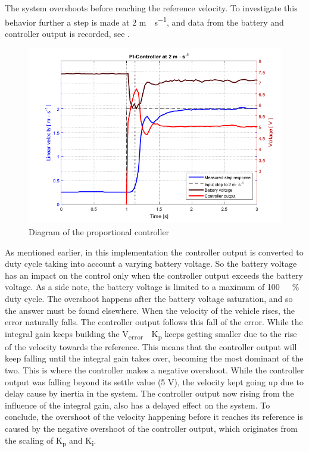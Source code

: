 %
The system overshoots before reaching the reference velocity. To investigate this behavior further a step is made at 2 \si{m\cdot s^{-1}}, and data from the battery and controller output is recorded, see .
%
\begin{figure}[H]
 	\centering
 	\includegraphics[width=\textwidth]{figures/PInoAntiWindup}
 	\caption{Diagram of the proportional controller}
 	\label{fig:PInoAntiWindup}
\end{figure}
%
As mentioned earlier, in this implementation the controller output is converted to duty cycle taking into account a varying battery voltage. So the battery voltage has an impact on the control only when the controller output exceeds the battery voltage. As a side note, the battery voltage is limited to a maximum of \si{100 \ \%} duty cycle.
The overshoot happens after the battery voltage saturation, and so the answer must be found elsewhere.
When the velocity of the vehicle rises, the error naturally falls. The controller output follows this fall of the error. While the integral gain keeps building the \si{V_{error}\cdot K_p} keeps getting smaller due to the rise of the velocity towards the reference. This means that the controller output will keep falling until the integral gain takes over, becoming the most dominant of the two. This is where the controller makes a negative overshoot.
While the controller output was falling beyond its settle value (5 V), the velocity kept going up due to delay cause by inertia in the system. The controller output now rising from the influence of the integral gain, also has a delayed effect on the system.
To conclude, the overshoot of the velocity happening before it reaches its reference is caused by the negative overshoot of the controller output, which originates from the scaling of \si{K_p} and \si{K_i}.
